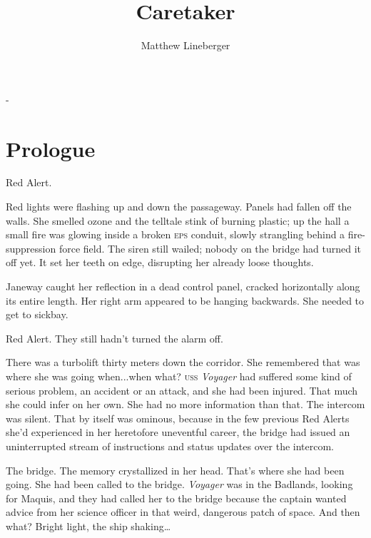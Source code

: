 \documentclass[twoside,letterpaper,12pt]{memoir}
\title{Caretaker}
\author{Matthew Lineberger}
\date
\begin{document}
\setmainfont[Ligatures=TeX, Numbers=Lowercase]{Garamond Premier Pro}

\begin{titlingpage}
	\calccentering{\unitlength}
	\begin{adjustwidth*}{\unitlength}{-\unitlength}
	\maketitle 
	\end{adjustwidth*}
\end{titlingpage}

\pagestyle{simple}

\chapter*{Prologue}

\noindent Red Alert.

Red lights were flashing up and down the passageway. Panels had fallen off the walls. She smelled ozone and the telltale stink of burning plastic; up the hall a small fire was glowing inside a broken \textsc{eps} conduit, slowly strangling behind a fire-suppression force field. The siren still wailed; nobody on the bridge had turned it off yet. It set her teeth on edge, disrupting her already loose thoughts.

Janeway caught her reflection in a dead control panel, cracked horizontally along its entire length. Her right arm appeared to be hanging backwards. She needed to get to sickbay.

Red Alert. They still hadn't turned the alarm off.

There was a turbolift thirty meters down the corridor. She remembered that was where she was going when...when what? \textsc{uss} \textit{Voyager} had suffered some kind of serious problem, an accident or an attack, and she had been injured. That much she could infer on her own. She had no more information than that. The intercom was silent. That by itself was ominous, because in the few previous Red Alerts she'd experienced in her heretofore uneventful career, the bridge had issued an uninterrupted stream of instructions and status updates over the intercom.

The bridge. The memory crystallized in her head. That's where she had been going. She had been called to the bridge. \textit{Voyager} was in the Badlands, looking for Maquis, and they had called her to the bridge because the captain wanted advice from her science officer in that weird, dangerous patch of space. And then what? Bright light, the ship shaking…
\end{document}
